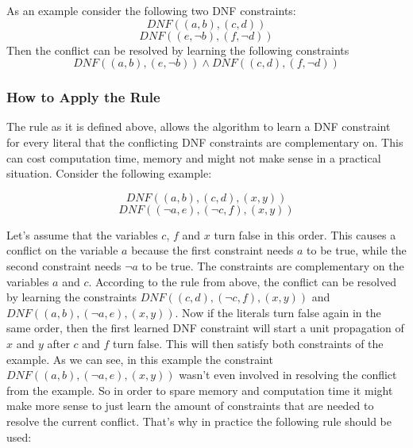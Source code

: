 As an example consider the following two DNF constraints:
\begin{displaymath}
DNF ((a,b),(c,d))
\end{displaymath}
\begin{displaymath}
DNF ((e,\neg b),(f,\neg d))
\end{displaymath}
Then the conflict can be resolved by learning the following constraints
\begin{displaymath}
DNF ((a,b),(e,\neg b)) \wedge DNF ((c,d),(f,\neg d))
\end{displaymath}

\subsubsection{How to Apply the Rule}

The rule as it is defined above, allows the algorithm to learn a DNF constraint for every literal that the conflicting DNF constraints are complementary on. This can cost computation time, memory and might not make sense in a practical situation. Consider the following example:

\begin{leftbar}
\begin{displaymath}
DNF((a,b),(c,d),(x,y))
\end{displaymath}
\begin{displaymath}
DNF((\neg a, e),(\neg c, f), (x,y))
\end{displaymath}
\end{leftbar}

Let's assume that the variables $c$, $f$ and $x$ turn false in this order. This causes a conflict on the variable $a$ because the first constraint needs $a$ to be true, while the second constraint needs $\neg a$ to be true. The constraints are complementary on the variables $a$ and $c$. According to the rule from above, the conflict can be resolved by learning the constraints $DNF((c,d),(\neg c, f),(x,y))$ and $DNF((a,b),(\neg a, e),(x,y))$. Now if the literals turn false again in the same order, then the first learned DNF constraint will start a unit propagation of $x$ and $y$ after $c$ and $f$ turn false. This will then satisfy both constraints of the example. As we can see, in this example the constraint $DNF((a,b),(\neg a, e),(x,y))$ wasn't even involved in resolving the conflict from the example. So in order to spare memory and computation time it might make more sense to just learn the amount of constraints that are needed to resolve the current conflict. That's why in practice the following rule should be used:

